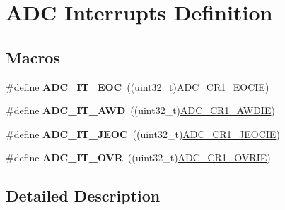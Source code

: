 \hypertarget{group___a_d_c__interrupts__definition}{}\section{A\+DC Interrupts Definition}
\label{group___a_d_c__interrupts__definition}
\subsection*{Macros}
\begin{DoxyCompactItemize}
\item 
\mbox{\label{group___a_d_c__interrupts__definition_ga0ad335d835f54415194d448019569e00}} 
\#define {\bfseries A\+D\+C\+\_\+\+I\+T\+\_\+\+E\+OC}~((uint32\+\_\+t)\mbox{\hyperlink{group___peripheral___registers___bits___definition_gaa39fee2e812a7ca45998cccf32e90aea}{A\+D\+C\+\_\+\+C\+R1\+\_\+\+E\+O\+C\+IE}})
\item 
\mbox{\label{group___a_d_c__interrupts__definition_ga2f5c7f9900c24250a0c6ccaa7cbca946}} 
\#define {\bfseries A\+D\+C\+\_\+\+I\+T\+\_\+\+A\+WD}~((uint32\+\_\+t)\mbox{\hyperlink{group___peripheral___registers___bits___definition_gacd44f86b189696d5a3780342516de722}{A\+D\+C\+\_\+\+C\+R1\+\_\+\+A\+W\+D\+IE}})
\item 
\mbox{\label{group___a_d_c__interrupts__definition_gad439fc0cd69706704d47aeabfeddb631}} 
\#define {\bfseries A\+D\+C\+\_\+\+I\+T\+\_\+\+J\+E\+OC}~((uint32\+\_\+t)\mbox{\hyperlink{group___peripheral___registers___bits___definition_ga5c46fc1dc6c63acf88821f46a8f6d5e7}{A\+D\+C\+\_\+\+C\+R1\+\_\+\+J\+E\+O\+C\+IE}})
\item 
\mbox{\label{group___a_d_c__interrupts__definition_gac3852b7789860e0ea79b82115ab877a0}} 
\#define {\bfseries A\+D\+C\+\_\+\+I\+T\+\_\+\+O\+VR}~((uint32\+\_\+t)\mbox{\hyperlink{group___peripheral___registers___bits___definition_gaa892fda7c204bf18a33a059f28be0fba}{A\+D\+C\+\_\+\+C\+R1\+\_\+\+O\+V\+R\+IE}})
\end{DoxyCompactItemize}


\subsection{Detailed Description}
